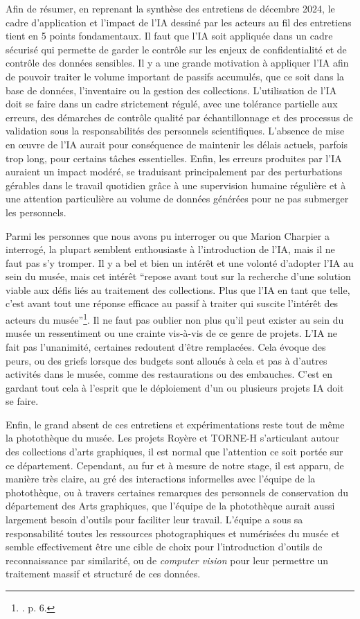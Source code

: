 Afin de résumer, en reprenant la synthèse des entretiens de décembre 2024, le cadre d'application et l'impact de l'IA dessiné par les acteurs au fil des entretiens tient en 5 points fondamentaux. Il faut que l'IA soit appliquée dans un cadre sécurisé qui permette de garder le contrôle sur les enjeux de confidentialité et de contrôle des données sensibles. Il y a une grande motivation à appliquer l'IA afin de pouvoir traiter le volume important de passifs accumulés, que ce soit dans la base de données, l'inventaire ou la gestion des collections. L'utilisation de l'IA doit se faire dans un cadre strictement régulé, avec une tolérance partielle aux erreurs, des démarches de contrôle qualité par échantillonnage et des processus de validation sous la responsabilités des personnels scientifiques. L'absence de mise en œuvre de l'IA aurait pour conséquence de maintenir les délais actuels, parfois trop long, pour certains tâches essentielles. Enfin, les erreurs produites par l'IA auraient un impact modéré, se traduisant principalement par des perturbations gérables dans le travail quotidien grâce à une supervision humaine régulière et à une attention particulière au volume de données générées pour ne pas submerger les personnels.

Parmi les personnes que nous avons pu interroger ou que Marion Charpier a interrogé, la plupart semblent enthousiaste à l'introduction de l'IA, mais il ne faut pas s'y tromper. Il y a bel et bien un intérêt et une volonté d'adopter l'IA au sein du musée, mais cet intérêt \enquote{repose avant tout sur la recherche d'une solution viable aux défis liés au traitement des collections. Plus que l'IA en tant que telle, c'est avant tout une réponse efficace au passif à traiter qui suscite l'intérêt des acteurs du musée}\footnote{\cite{bermes_repenser_2025}. p. 6.}. Il ne faut pas oublier non plus qu'il peut exister au sein du musée un ressentiment ou une crainte vis-à-vis de ce genre de projets. L'IA ne fait pas l'unanimité, certain\wokisme e\wokisme s redoutent d'être remplacé\wokisme e\wokisme s. Cela évoque des peurs, ou des griefs lorsque des budgets sont alloués à cela et pas à d'autres activités dans le musée, comme des restaurations ou des embauches. C'est en gardant tout cela à l'esprit que le déploiement d'un ou plusieurs projets IA doit se faire. 

Enfin, le grand absent de ces entretiens et expérimentations reste tout de même la photothèque du musée. Les projets Royère et TORNE-H s'articulant autour des collections d'arts graphiques, il est normal que l'attention ce soit portée sur ce département. Cependant, au fur et à mesure de notre stage, il est apparu, de manière très claire, au gré des interactions informelles avec l'équipe de la photothèque, ou à travers certaines remarques des personnels de conservation du département des Arts graphiques, que l'équipe de la photothèque aurait aussi largement besoin d'outils pour faciliter leur travail. L'équipe a sous sa responsabilité toutes les ressources photographiques et numérisées du musée et semble effectivement être une cible de choix pour l'introduction d'outils de reconnaissance par similarité, ou de \textit{computer vision} pour leur permettre un traitement massif et structuré de ces données. 

